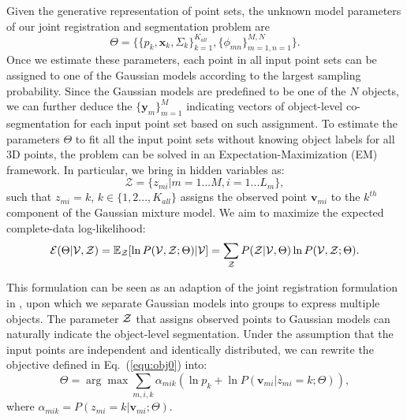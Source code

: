 Given the generative representation of point sets, the unknown model parameters of our joint registration and segmentation problem are
%
\begin{equation}
\varTheta=\big \{\{p_k,\mathbf{x}_{k},\Sigma_k\}_{k=1}^{K_{all}},\{\phi_{mn}\}_{m=1,n=1}^{M,N}\big\}.
\end{equation}
%
Once we estimate these parameters, each point in all input point sets can be assigned to one of the Gaussian models according to the largest sampling probability.
%
Since the Gaussian models are predefined to be one of the $N$ objects, we can further deduce the $\{\mathbf{y}_m\}_{m=1}^M$ indicating vectors of object-level co-segmentation for each input point set based on such assignment.
%
To estimate the parameters $\Theta$ to fit all the input point sets without knowing object labels for all 3D points, the problem can be solved in an Expectation-Maximization (EM) framework. 
%
In particular, we bring in hidden variables as: 
\begin{equation}
\mathcal{Z}=\{z_{mi}|m=1...M,i=1...L_m\},
\end{equation}
%
such that $z_{mi}=k$, $k \in \{1,2...,K_{all}\}$ assigns the observed point $\mathbf{v}_{mi}$ to the $k^{th}$ component of the Gaussian mixture model. 
%
We aim to maximize the expected complete-data log-likelihood:
\begin{equation}
\label{equ:obj0}
\mathcal{E}(\Theta|\mathcal{V},\mathcal{Z})=\mathbb{E}_{\mathcal{Z}}[\ln P(\mathcal{V},\mathcal{Z};\Theta)|\mathcal{V}]={\sum_{\mathcal{Z}}P(\mathcal{Z}|\mathcal{V},\Theta)\ln{P(\mathcal{V},\mathcal{Z};\Theta)}}.
\end{equation}


This formulation can be seen as an adaption of the joint registration formulation in \cite{Evangelidis2014}, upon which we separate Gaussian models into groups to express multiple objects. 
%
The parameter $\mathcal{Z}$ that assigns observed points to Gaussian models can naturally indicate the object-level segmentation.
%
Under the assumption that the input points are independent and identically distributed, we can rewrite the objective defined in Eq.~(\ref{equ:obj0}) into:
%
\begin{equation} \label{equ:obj2}
\Theta=\arg\max\sum_{m,i,k}\alpha_{mik}(\ln p_k + \ln P(\mathbf{v}_{mi}|z_{mi}=k;\Theta)),
\end{equation}
%
where $\alpha_{mik} = P( z_{mi} = k | \mathbf{v}_{mi} ; \Theta )$.


